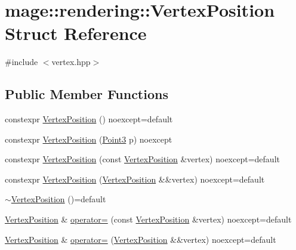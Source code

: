 \hypertarget{structmage_1_1rendering_1_1_vertex_position}{}\section{mage\+:\+:rendering\+:\+:Vertex\+Position Struct Reference}
\label{structmage_1_1rendering_1_1_vertex_position}


{\ttfamily \#include $<$vertex.\+hpp$>$}

\subsection*{Public Member Functions}
\begin{DoxyCompactItemize}
\item 
constexpr \mbox{\hyperlink{structmage_1_1rendering_1_1_vertex_position_a9df4fa391d76a89997e8b512fc3142d2}{Vertex\+Position}} () noexcept=default
\item 
constexpr \mbox{\hyperlink{structmage_1_1rendering_1_1_vertex_position_afeb47bb7062e42f0bdaf7039abc4b7cb}{Vertex\+Position}} (\mbox{\hyperlink{structmage_1_1_point3}{Point3}} p) noexcept
\item 
constexpr \mbox{\hyperlink{structmage_1_1rendering_1_1_vertex_position_a2f93e143d8e24b4de51eea1e73e8ad62}{Vertex\+Position}} (const \mbox{\hyperlink{structmage_1_1rendering_1_1_vertex_position}{Vertex\+Position}} \&vertex) noexcept=default
\item 
constexpr \mbox{\hyperlink{structmage_1_1rendering_1_1_vertex_position_ad886c8131e6cf96dac4a716907b532ad}{Vertex\+Position}} (\mbox{\hyperlink{structmage_1_1rendering_1_1_vertex_position}{Vertex\+Position}} \&\&vertex) noexcept=default
\item 
\mbox{\hyperlink{structmage_1_1rendering_1_1_vertex_position_afe5c10d9422cd3b37acecd3691361057}{$\sim$\+Vertex\+Position}} ()=default
\item 
\mbox{\hyperlink{structmage_1_1rendering_1_1_vertex_position}{Vertex\+Position}} \& \mbox{\hyperlink{structmage_1_1rendering_1_1_vertex_position_ae33b66ce10c878f9f38867ccdcebdadd}{operator=}} (const \mbox{\hyperlink{structmage_1_1rendering_1_1_vertex_position}{Vertex\+Position}} \&vertex) noexcept=default
\item 
\mbox{\hyperlink{structmage_1_1rendering_1_1_vertex_position}{Vertex\+Position}} \& \mbox{\hyperlink{structmage_1_1rendering_1_1_vertex_position_ad6ea7633290d8f1bd38969f78145237f}{operator=}} (\mbox{\hyperlink{structmage_1_1rendering_1_1_vertex_position}{Vertex\+Position}} \&\&vertex) noexcept=default
\end{DoxyCompactItemize}
